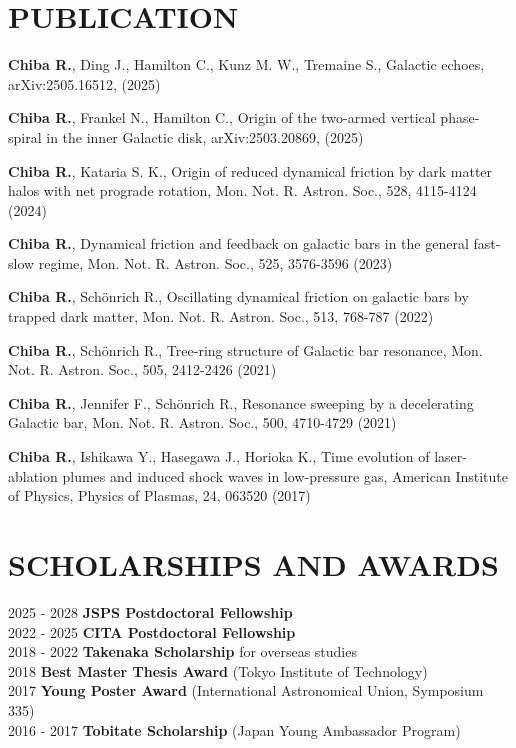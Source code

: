 \documentclass[]{res}
\begin{document}
\begin{resume}
\section{PUBLICATION}
\begin{etaremune}[leftmargin=6mm,rightmargin=-6mm]
    \item \textbf{Chiba R.}, Ding J., Hamilton C., Kunz M. W., Tremaine S., Galactic echoes, arXiv:2505.16512, (2025)
    \item \textbf{Chiba R.}, Frankel N., Hamilton C., Origin of the two-armed vertical phase-spiral in the inner Galactic disk, arXiv:2503.20869, (2025)
    \item \textbf{Chiba R.}, Kataria S. K., Origin of reduced dynamical friction by dark matter halos with net prograde rotation, Mon. Not. R. Astron. Soc., 528, 4115-4124 (2024)
    \item \textbf{Chiba R.}, Dynamical friction and feedback on galactic bars in the general fast-slow regime, Mon. Not. R. Astron. Soc., 525, 3576-3596 (2023)
    \item \textbf{Chiba R.}, Schönrich R., Oscillating dynamical friction on galactic bars by trapped dark matter, Mon. Not. R. Astron. Soc., 513, 768-787 (2022)
    \item \textbf{Chiba R.}, Schönrich R., Tree-ring structure of Galactic bar resonance, Mon. Not. R. Astron. Soc., 505, 2412-2426 (2021)
    \item \textbf{Chiba R.}, Jennifer F., Schönrich R., Resonance sweeping by a decelerating Galactic bar, Mon. Not. R. Astron. Soc., 500, 4710-4729 (2021)
    \item \textbf{Chiba R.}, Ishikawa Y., Hasegawa J., Horioka K., Time evolution of laser-ablation plumes and induced shock waves in low-pressure gas, American Institute of Physics, Physics of Plasmas, 24, 063520 (2017)
\end{etaremune}

\section{SCHOLARSHIPS AND AWARDS}
\noindent
\begin{tabbing}
    2025 - 2028 \hspace{2mm} \=\textbf{JSPS Postdoctoral Fellowship}\\
    2022 - 2025 \hspace{2mm} \=\textbf{CITA Postdoctoral Fellowship}\\
    2018 - 2022 \hspace{2mm} \=\textbf{Takenaka Scholarship} for overseas studies\\
    2018        \hspace{2mm} \>\textbf{Best Master Thesis Award} (Tokyo Institute of Technology)\\
    2017        \hspace{2mm} \>\textbf{Young Poster Award} (International Astronomical Union, Symposium 335)\\
    2016 - 2017 \hspace{2mm} \>\textbf{Tobitate Scholarship} (Japan Young Ambassador Program)
\end{tabbing}


\end{resume}
\end{document}
